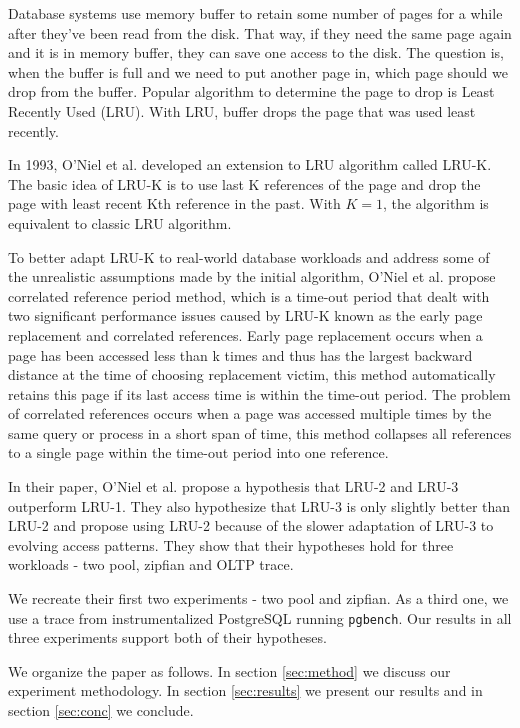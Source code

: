 Database systems use memory buffer to retain some number of pages for a while after they've been read from the disk. That way, if they need the same page again and it is in memory buffer, they can save one access to the disk. The question is, when the buffer is full and we need to put another page in, which page should we drop from the buffer. Popular algorithm to determine the page to drop is Least Recently Used (LRU). With LRU, buffer drops the page that was used least recently.

In 1993, O'Niel et al. \cite{lruk} developed an extension to LRU algorithm called LRU-K. The basic idea of LRU-K is to use last K references of the page and drop the page with least recent Kth reference in the past. With $K = 1$, the algorithm is equivalent to classic LRU algorithm.

To better adapt LRU-K to real-world database workloads and address some of the unrealistic assumptions made by the initial algorithm, O'Niel et al. propose correlated reference period method, which is a time-out period that dealt with two significant performance issues caused by LRU-K known as the early page replacement and correlated references. Early page replacement occurs when a page has been accessed less than k times and thus has the largest backward distance at the time of choosing replacement victim, this method automatically retains this page if its last access time is within the time-out period. The problem of correlated references occurs when a page was accessed multiple times by the same query or process in a short span of time, this method collapses all references to a single page within the time-out period into one reference.

In their paper, O'Niel et al. propose a hypothesis that LRU-2 and LRU-3 outperform LRU-1. They also hypothesize that LRU-3 is only slightly better than LRU-2 and propose using LRU-2 because of the slower adaptation of LRU-3 to evolving access patterns. They show that their hypotheses hold for three workloads - two pool, zipfian and OLTP trace.

We recreate their first two experiments - two pool and zipfian. As a third one, we use a trace from instrumentalized PostgreSQL running \texttt{pgbench}. Our results in all three experiments support both of their hypotheses.

We organize the paper as follows. In section \ref{sec:method} we discuss our experiment methodology. In section \ref{sec:results} we present our results and in section \ref{sec:conc} we conclude.
